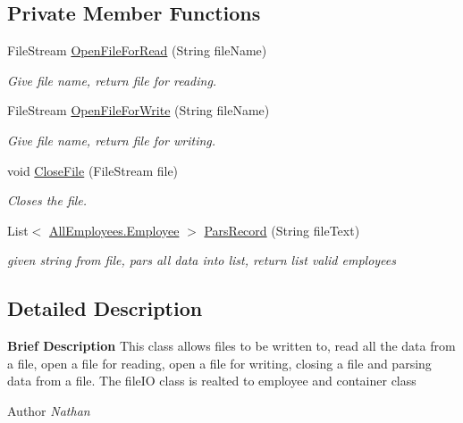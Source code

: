 \subsection*{Private Member Functions}
\begin{DoxyCompactItemize}
\item 
File\+Stream \hyperlink{class_supporting_1_1_file_i_o_ac9cebd77d6aca1292566d7e6eb4f8123}{Open\+File\+For\+Read} (String file\+Name)
\begin{DoxyCompactList}\small\item\em Give file name, return file for reading. \end{DoxyCompactList}\item 
File\+Stream \hyperlink{class_supporting_1_1_file_i_o_ab3be0f867327310b9d940d79e1147b69}{Open\+File\+For\+Write} (String file\+Name)
\begin{DoxyCompactList}\small\item\em Give file name, return file for writing. \end{DoxyCompactList}\item 
void \hyperlink{class_supporting_1_1_file_i_o_a689379fbd7441f18477d01dfde06444c}{Close\+File} (File\+Stream file)
\begin{DoxyCompactList}\small\item\em Closes the file. \end{DoxyCompactList}\item 
List$<$ \hyperlink{class_all_employees_1_1_employee}{All\+Employees.\+Employee} $>$ \hyperlink{class_supporting_1_1_file_i_o_ab4433298adf44f58cbd355eb5db0bf7f}{Pars\+Record} (String file\+Text)
\begin{DoxyCompactList}\small\item\em given string from file, pars all data into list, return list valid employees \end{DoxyCompactList}\end{DoxyCompactItemize}


\subsection{Detailed Description}
{\bfseries Brief Description} This class allows files to be written to, read all the data from a file, open a file for reading, open a file for writing, closing a file and parsing data from a file. The file\+I\+O class is realted to employee and container class 

\begin{DoxyAuthor}{Author}
{\itshape Nathan} 
\end{DoxyAuthor}


